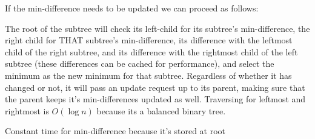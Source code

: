 \documentclass[12pt]{article}
\begin{document}
\begin{enumerate}
If the min-difference needs to be updated we can proceed as follows:

The root of the subtree will check its left-child for its subtree's min-difference, the right child for THAT subtree's min-difference, its difference with the leftmost child of the right subtree, and its difference with the rightmost child of the left subtree 
(these differences can be cached for performance), and select the minimum as the new minimum for that subtree. Regardless of whether it has changed or not, it will pass an update request up to its parent,
making sure that the parent keeps it's min-differences updated as well. Traversing for leftmost and rightmost is $O(\log n)$ because its a balanced binary tree.

Constant time for min-difference because it's stored at root


\end{enumerate}
\end{document}
